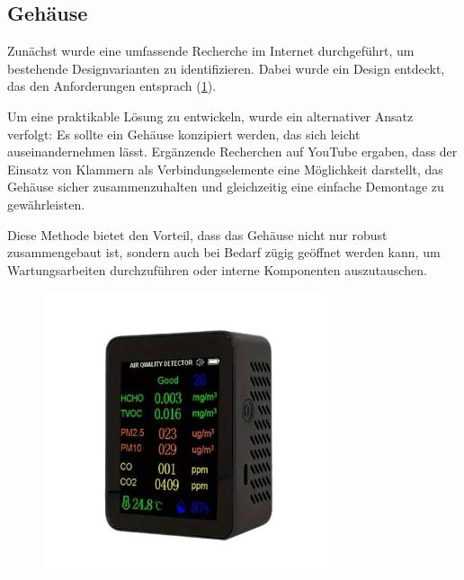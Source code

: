 \begin{inhalt}
\clearpage  %

\newpage

\section{Gehäuse}

Zunächst wurde eine umfassende Recherche im Internet durchgeführt, um bestehende Designvarianten zu identifizieren. Dabei wurde ein Design entdeckt, das den Anforderungen entsprach \cite{TemuGehaeuseURL}(\ref{fig:gehaeuse_internet_bild}).

Um eine praktikable Lösung zu entwickeln, wurde ein alternativer Ansatz verfolgt: Es sollte ein Gehäuse konzipiert werden, das sich leicht auseinandernehmen lässt. Ergänzende Recherchen auf YouTube \cite{GehaeuseYoutubeClipsURL} ergaben, dass der Einsatz von Klammern als Verbindungselemente eine Möglichkeit darstellt, das Gehäuse sicher zusammenzuhalten und gleichzeitig eine einfache Demontage zu gewährleisten.

Diese Methode bietet den Vorteil, dass das Gehäuse nicht nur robust zusammengebaut ist, sondern auch bei Bedarf zügig geöffnet werden kann, um Wartungsarbeiten durchzuführen oder interne Komponenten auszutauschen.

\begin{figure}[!htb]
\centering
\includegraphics[width=0.75\textwidth]{files/Thomas/pics/new/Temu-removebg-preview.png}
\caption[Bildbezeichnung für Abbildungsverzeichnis]{}
\label{fig:gehaeuse_internet_bild}
\end{figure}



\end{inhalt}